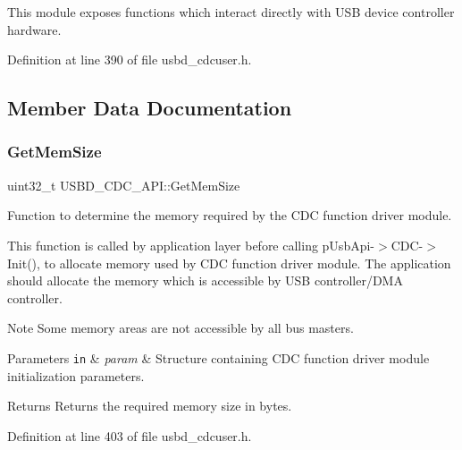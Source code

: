 This module exposes functions which interact directly with U\+SB device controller hardware. 



Definition at line 390 of file usbd\+\_\+cdcuser.\+h.



\subsection{Member Data Documentation}
\mbox{\label{struct_u_s_b_d___c_d_c___a_p_i_abde21c25f0b02b4d3ec9af0e41378437}} 
\subsubsection{\texorpdfstring{Get\+Mem\+Size}{GetMemSize}}
{\footnotesize\ttfamily uint32\+\_\+t U\+S\+B\+D\+\_\+\+C\+D\+C\+\_\+\+A\+P\+I\+::\+Get\+Mem\+Size}

Function to determine the memory required by the C\+DC function driver module.

This function is called by application layer before calling p\+Usb\+Api-\/$>$C\+D\+C-\/$>$Init(), to allocate memory used by C\+DC function driver module. The application should allocate the memory which is accessible by U\+SB controller/\+D\+MA controller. \begin{DoxyNote}{Note}
Some memory areas are not accessible by all bus masters.
\end{DoxyNote}

\begin{DoxyParams}[1]{Parameters}
\mbox{\tt in}  & {\em param} & Structure containing C\+DC function driver module initialization parameters. \\
\hline
\end{DoxyParams}
\begin{DoxyReturn}{Returns}
Returns the required memory size in bytes. 
\end{DoxyReturn}


Definition at line 403 of file usbd\+\_\+cdcuser.\+h.

\mbox{\label{struct_u_s_b_d___c_d_c___a_p_i_a3c3f8725643c607bca1cf3f422dc5702}} 
